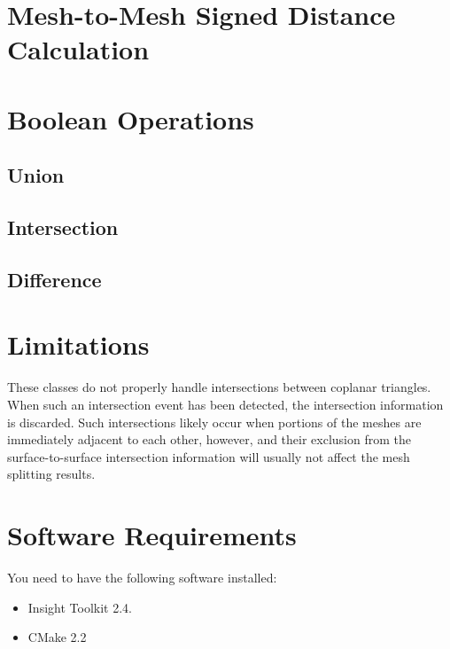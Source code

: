 \documentclass{InsightArticle}
\begin{document}
\section{Mesh-to-Mesh Signed Distance Calculation}

\section{Boolean Operations}

\subsection{Union}

\subsection{Intersection}

\subsection{Difference}

\section{Limitations}

These classes do not properly handle intersections between coplanar triangles. When such an intersection event has been detected, the intersection information is discarded. Such intersections likely occur when portions of the meshes are immediately adjacent to each other, however, and their exclusion from the surface-to-surface intersection information will usually not affect the mesh splitting results.

\section{Software Requirements}

You need to have the following software installed:

\begin{itemize}
  \item  Insight Toolkit 2.4.
  \item  CMake 2.2
\end{itemize}
\end{document}
